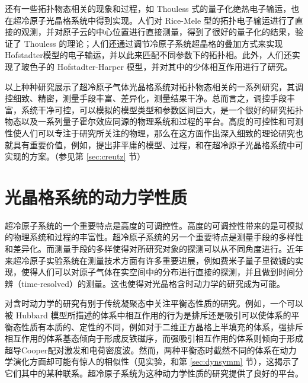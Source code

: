 还有一些拓扑物态相关的现象和过程，如 Thouless 式的量子化绝热电子输运\cite{thouless1983}，也在超冷原子光晶格系统中得到实现\cite{charge-pump-expr-2016-de,charge-pump-expr-2016-jp}。人们对 Rice-Mele 型的拓扑电子输运进行了直接的观测\cite{charge-pump-expr-2016-de,charge-pump-expr-2016-jp}，并对原子云的中心位置进行直接测量，得到了很好的量子化的结果，验证了 Thouless 的理论；人们还通过调节冷原子系统超晶格的叠加方式来实现 Hofstadter模型的电子输运\cite{charge-pump-expr-2016-de}，并以此来匹配不同参数下的拓扑相\cite{charge-pump-expr-2016-de}。此外，人们还实现了玻色子的 Hofstadter-Harper 模型\cite{twobody-2017}，并对其中的少体相互作用进行了研究。

以上种种研究展示了超冷原子气体光晶格系统对拓扑物态相关的一系列研究，其调控细致、精密，测量手段丰富、差异化，测量结果干净。总而言之，调控手段丰富，系统干净可控，可以模拟的模型类型和参数区间巨大，是一个很好的研究拓扑物态以及一系列量子霍尔效应同源的物理系统和过程的平台。高度的可控性和可测性使人们可以专注于研究所关注的物理，那么在这方面作出深入细致的理论研究也就具有重要价值，例如，提出非平庸的模型、过程，和在超冷原子光晶格系统中可实现的方案。（参见第 \ref{sec:creutz} 节）



\section{光晶格系统的动力学性质}

超冷原子系统的一个重要特点是高度的可调控性。高度的可调控性带来的是可模拟的物理系统和过程的丰富性。超冷原子系统的另一个重要特点是测量手段的多样性和差异化。而测量手段的多样使得对所研究对象的探测可以从不同角度进行。近年来超冷原子实验系统在测量技术方面有许多重要进展，例如费米子量子显微镜\cite{microscope1,microscope2,microscope3,microscope4,microscope5,microscope6}的实现，使得人们可以对原子气体在实空间中的分布进行直接的探测，并且做到时间分辨（time-resolved）的测量。这也使得对光晶格含时动力学的研究成为可能。

对含时动力学的研究有别于传统凝聚态中关注平衡态性质的研究。例如，一个可以被 Hubbard 模型所描述的体系中相互作用的行为是排斥还是吸引可以使体系的平衡态性质有本质的、定性的不同，例如对于二维正方晶格上半填充的体系，强排斥相互作用的体系基态倾向于形成反铁磁序，而强吸引相互作用的体系则倾向于形成超导Cooper配对激发和电荷密度波\cite{nagaosa}。然而，两种平衡态时截然不同的体系在动力学演化方面却可能有惊人的相似性（见实验，和第 \ref{sec:dynsymm} 节），这揭示了它们其中的某种联系。超冷原子系统为这种动力学性质的研究提供了良好的平台。

